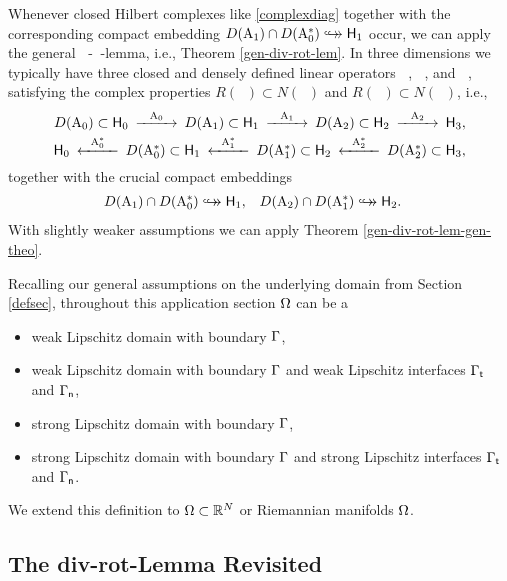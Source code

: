 \documentclass[a4paper]{amsart}
\renewcommand{\H}{\mathsf{H}}
\DeclareMathOperator{\Az}{A_{0}}
\DeclareMathOperator{\Azs}{A_{0}^{*}}
\DeclareMathOperator{\Ao}{A_{1}}
\DeclareMathOperator{\Aos}{A_{1}^{*}}
\DeclareMathOperator{\At}{A_{2}}
\DeclareMathOperator{\Ats}{A_{2}^{*}}
\newcommand{\cptemb}{\hookto\hspace*{-0.85em}\hookto}
\begin{document}
Whenever closed Hilbert complexes like \eqref{complexdiag} 
together with the corresponding compact embedding $D(\Ao)\cap D(\Azs)\cptemb\H_{1}$ occur, 
we can apply the general $\Azs$-$\Ao$-lemma, i.e., Theorem \ref{gen-div-rot-lem}.
In three dimensions we typically have three closed and densely defined linear operators
$\Az$, $\Ao$, and $\At$, satisfying the complex properties
$R(\Az)\subset N(\Ao)$ and $R(\Ao)\subset N(\At)$, i.e.,
\begin{align}
\begin{split}
\mylabel{complexdiagAzot}
\begin{CD}
D(\Az)\subset\H_{0} @> \Az >>
D(\Ao)\subset\H_{1} @> \Ao >>
D(\At)\subset\H_{2} @> \At >>
\H_{3},
\end{CD}\\
\begin{CD}
\H_{0} @< \Azs <<
D(\Azs)\subset\H_{1} @< \Aos <<
D(\Aos)\subset\H_{2} @< \Ats <<
D(\Ats)\subset\H_{3},
\end{CD}
\end{split}
\end{align}
together with the crucial compact embeddings
\begin{align}
\mylabel{crucialemb}
D(\Ao)\cap D(\Azs)&\cptemb\H_{1},
&
D(\At)\cap D(\Aos)&\cptemb\H_{2}.
\end{align}
With slightly weaker assumptions we can apply Theorem \ref{gen-div-rot-lem-gen-theo}.

Recalling our general assumptions on the underlying domain from Section \ref{defsec},
throughout this application section $\Omega$ can be a
\begin{itemize}
\item
weak Lipschitz domain with boundary $\Gamma$,
\item
weak Lipschitz domain with boundary $\Gamma$ and weak Lipschitz interfaces $\Gamma_{\mathsf{t}}$ and $\Gamma_{\mathsf{n}}$,
\item
strong Lipschitz domain with boundary $\Gamma$,
\item
strong Lipschitz domain with boundary $\Gamma$ and strong Lipschitz interfaces $\Gamma_{\mathsf{t}}$ and $\Gamma_{\mathsf{n}}$.
\end{itemize}
We extend this definition to $\Omega\subset\mathbb{R}^{N}$ or Riemannian manifolds $\Omega$.

\subsection{The div-rot-Lemma Revisited}
\end{document}
